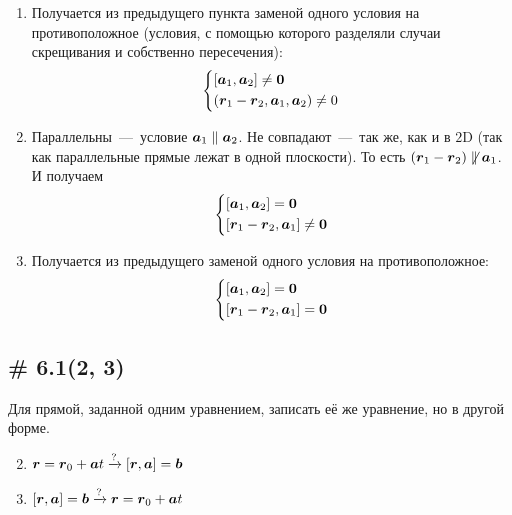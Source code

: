 \documentclass[a4paper,12pt]{article}
\begin{document}
\begin{solution}
\begin{enumerate}
      \item Получается из предыдущего пункта заменой одного условия на противоположное (условия, с помощью которого разделяли случаи скрещивания и собственно пересечения):
      \[
        \left\{
          \begin{aligned}
            &[\boldsymbol a_1, \boldsymbol a_2] \not= \boldsymbol 0\\
            &(\boldsymbol r_1 - \boldsymbol r_2, \boldsymbol a_1, \boldsymbol a_2) \not= 0
          \end{aligned}
        \right.
      \]
      
      \item Параллельны~---~условие $\bds a_1 \hm\parallel \bds a_2$.
      Не совпадают~---~так же, как и в $2$D (так как параллельные прямые лежат в одной плоскости).
      То есть $(\bds r_1 \hm- \bds r_2) \hm{\not\parallel} \bds a_1$.
      И получаем
      \[
        \left\{
          \begin{aligned}
            &[\boldsymbol a_1, \boldsymbol a_2] = \boldsymbol 0\\
            &[\boldsymbol r_1 - \boldsymbol r_2, \boldsymbol a_1] \not= \boldsymbol 0
          \end{aligned}
        \right.
      \]
      
      \item Получается из предыдущего заменой одного условия на противоположное:
      \[
        \left\{
          \begin{aligned}
            &[\boldsymbol a_1, \boldsymbol a_2] = \boldsymbol 0\\
            &[\boldsymbol r_1 - \boldsymbol r_2, \boldsymbol a_1] = \boldsymbol 0
          \end{aligned}
        \right.
      \]
    \end{enumerate}
  \end{solution}
  
  
  \subsection{\# 6.1(2, 3)}
  
  \begin{problem}
    Для прямой, заданной одним уравнением, записать её же уравнение, но в другой форме.
    \begin{enumerate}
      \setcounter{enumi}{1}
      
      \item $\boldsymbol r = \boldsymbol r_0 + \boldsymbol a t \xrightarrow{\operatorname{?}} [\boldsymbol r, \boldsymbol a] = \boldsymbol b$
      
      \item $[\boldsymbol r, \boldsymbol a] = \boldsymbol b \xrightarrow{\operatorname{?}} \boldsymbol r = \boldsymbol r_0 + \boldsymbol a t$
    \end{enumerate}
  \end{problem}
  
\end{document}
